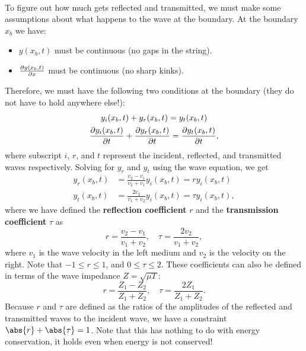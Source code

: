 \documentclass[../classical_mechanics.tex]{subfiles}
\begin{document}
        \paragraph{}
        To figure out how much gets reflected and transmitted, we must make some assumptions about what happens to the wave at the boundary.
        At the boundary $x_b$ we have:
        \begin{itemize}
            \item $y(x_b,t)$ must be continuous (no gaps in the string).
            \item $\pdv{y(x_b,t)}{x}$ must be continuous (no sharp kinks).
        \end{itemize}
        Therefore, we must have the following two conditions at the boundary (they do not have to hold anywhere else!):
        \begin{gather}
            y_i(x_b,t)+y_r(x_b,t)=y_t(x_b,t)\\
            \pdv{y_i(x_b,t)}{t}+\pdv{y_r(x_b,t)}{t}=\pdv{y_t(x_b,t)}{t},
        \end{gather}
        where subscript $i$, $r$, and $t$ represent the incident, reflected, and transmitted waves respectively.
        Solving for $y_r$ and $y_t$ using the wave equation, we get
        \begin{align}
            y_r(x_b,t)&=\frac{v_2-v_1}{v_2+v_1}y_i(x_b,t)=ry_i(x_b,t)\\
            y_t(x_b,t)&=\frac{2v_2}{v_1+v_2}y_i(x_b,t)=\tau y_i(x_b,t),
        \end{align}
        where we have defined the \textbf{reflection coefficient} $r$ and the \textbf{transmission coefficient} $\tau$ as
        \begin{equation}
            r=\frac{v_2-v_1}{v_1+v_2},\quad\tau=\frac{2v_2}{v_1+v_2},
        \end{equation}
        where $v_1$ is the wave velocity in the left medium and $v_2$ is the velocity on the right.
        Note that $-1\leq r\leq 1$, and $0\leq\tau\leq 2$.
        These coefficients can also be defined in terms of the wave impedance $Z=\sqrt{\mu T}$:
        \begin{equation}
            r=\frac{Z_1-Z_2}{Z_1+Z_2},\quad\tau=\frac{2Z_1}{Z_1+Z_2}.
        \end{equation}
        Because $r$ and $\tau$ are defined as the ratios of the amplitudes of the reflected and transmitted waves to the incident wave, we have a constraint $\abs{r}+\abs{\tau}=1$.
        Note that this has nothing to do with energy conservation, it holds even when energy is not conserved!
\end{document}
